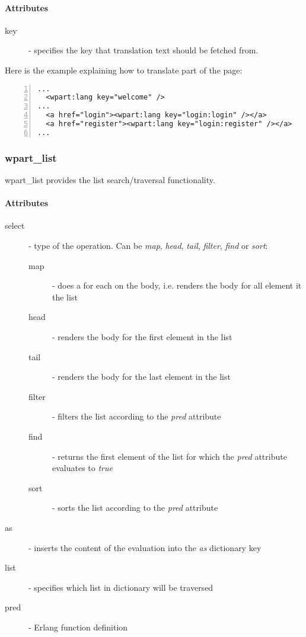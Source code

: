 \paragraph{Attributes}
\begin{description}
\item[key]- specifies the key that translation text should be fetched from.
\end{description}

Here is the example explaining how to translate part of the page:
\begin{Verbatim}[numbers=left, frame=single, label=main.html]
...
  <wpart:lang key="welcome" />
...
  <a href="login"><wpart:lang key="login:login" /></a>
  <a href="register"><wpart:lang key="login:register" /></a>
...
\end{Verbatim}

\subsubsection{wpart\_list} wpart\_list provides the list search/traversal functionality.

\paragraph{Attributes}
\begin{description}
\item[select]- type of the operation. Can be {\it map}, {\it head}, {\it tail}, {\it filter}, {\it find} or {\it sort}:
\begin{description}
\item[map]- does a for each on the body, i.e. renders the body for all element it the list
\item[head]- renders the body for the first element in the list
\item[tail]- renders the body for the last element in the list
\item[filter]- filters the list according to the {\it pred} attribute
\item[find]- returns the first element of the list for which the {\it pred} attribute evaluates to {\it true}
\item[sort]- sorts the list according to the {\it pred} attribute
\end{description}
\item[as]- inserts the content of the evaluation into the {\it as} dictionary key
\item[list]- specifies which list in dictionary will be traversed
\item[pred]- Erlang function definition
\end{description}

